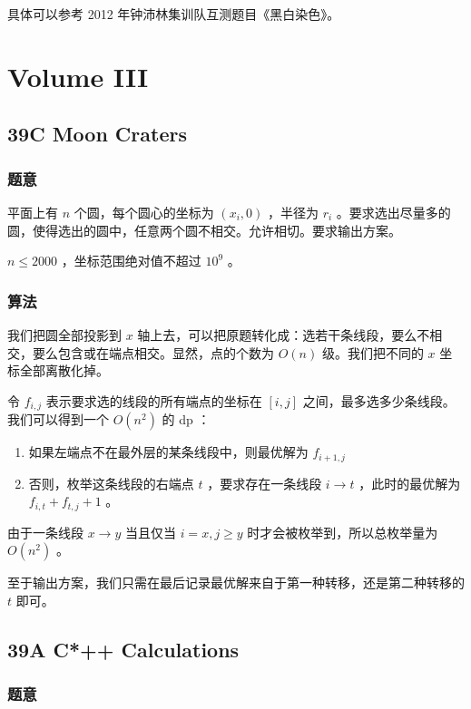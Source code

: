 \documentclass[11pt]{article}
\begin{document}
    具体可以参考 2012 年钟沛林集训队互测题目《黑白染色》。
\section{Volume III}
\label{sec-3}
\subsection{39C   Moon Craters}
\label{sec-3-1}
\subsubsection{题意}
\label{sec-3-1-1}

    平面上有 $n$ 个圆，每个圆心的坐标为 $(x_i, 0)$ ，半径为 $r_i$ 。要求选出尽量多的圆，使得选出的圆中，任意两个圆不相交。允许相切。要求输出方案。

    $n \leq 2000$ ，坐标范围绝对值不超过 $10^9$ 。
\subsubsection{算法}
\label{sec-3-1-2}

    我们把圆全部投影到 $x$ 轴上去，可以把原题转化成：选若干条线段，要么不相交，要么包含或在端点相交。显然，点的个数为 $O(n)$ 级。我们把不同的 $x$ 坐标全部离散化掉。

    令 $f_{i, j}$ 表示要求选的线段的所有端点的坐标在 $[i, j]$ 之间，最多选多少条线段。我们可以得到一个 $O(n^2)$ 的 dp ：
\begin{enumerate}
\item 如果左端点不在最外层的某条线段中，则最优解为 $f_{i + 1, j}$
\item 否则，枚举这条线段的右端点 $t$ ，要求存在一条线段 $i \to t$ ，此时的最优解为 $f_{i, t} + f_{t, j} + 1$ 。
\end{enumerate}

    由于一条线段 $x \to y$ 当且仅当 $i = x, j \geq y$ 时才会被枚举到，所以总枚举量为 $O(n^2)$ 。

    至于输出方案，我们只需在最后记录最优解来自于第一种转移，还是第二种转移的 $t$ 即可。
\subsection{39A   C*++ Calculations}
\label{sec-3-2}
\subsubsection{题意}
\label{sec-3-2-1}
\end{document}
